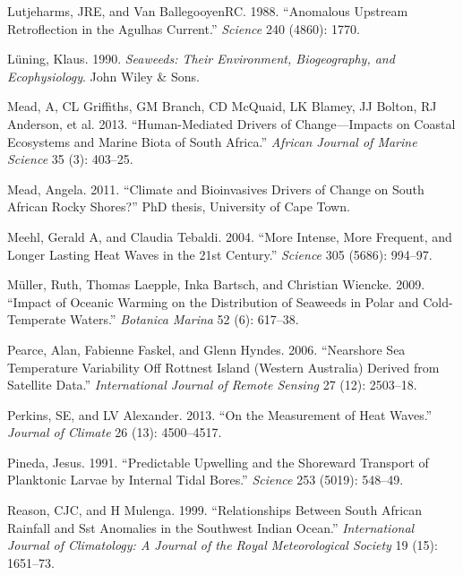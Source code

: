 \documentclass[12pt,a4paper,]{article}
\begin{document}
\leavevmode\hypertarget{ref-Lutjeharms1988}{}%
Lutjeharms, JRE, and Van BallegooyenRC. 1988. ``Anomalous Upstream
Retroflection in the Agulhas Current.'' \emph{Science} 240 (4860): 1770.

\leavevmode\hypertarget{ref-Luning1990}{}%
Lüning, Klaus. 1990. \emph{Seaweeds: Their Environment, Biogeography,
and Ecophysiology}. John Wiley \& Sons.

\leavevmode\hypertarget{ref-Mead2013}{}%
Mead, A, CL Griffiths, GM Branch, CD McQuaid, LK Blamey, JJ Bolton, RJ
Anderson, et al. 2013. ``Human-Mediated Drivers of Change---Impacts on
Coastal Ecosystems and Marine Biota of South Africa.'' \emph{African
Journal of Marine Science} 35 (3): 403--25.

\leavevmode\hypertarget{ref-Mead2011}{}%
Mead, Angela. 2011. ``Climate and Bioinvasives Drivers of Change on
South African Rocky Shores?'' PhD thesis, University of Cape Town.

\leavevmode\hypertarget{ref-Meehl2004}{}%
Meehl, Gerald A, and Claudia Tebaldi. 2004. ``More Intense, More
Frequent, and Longer Lasting Heat Waves in the 21st Century.''
\emph{Science} 305 (5686): 994--97.

\leavevmode\hypertarget{ref-Muller2009}{}%
Müller, Ruth, Thomas Laepple, Inka Bartsch, and Christian Wiencke. 2009.
``Impact of Oceanic Warming on the Distribution of Seaweeds in Polar and
Cold-Temperate Waters.'' \emph{Botanica Marina} 52 (6): 617--38.

\leavevmode\hypertarget{ref-Pearce2006}{}%
Pearce, Alan, Fabienne Faskel, and Glenn Hyndes. 2006. ``Nearshore Sea
Temperature Variability Off Rottnest Island (Western Australia) Derived
from Satellite Data.'' \emph{International Journal of Remote Sensing} 27
(12): 2503--18.

\leavevmode\hypertarget{ref-Perkins2013}{}%
Perkins, SE, and LV Alexander. 2013. ``On the Measurement of Heat
Waves.'' \emph{Journal of Climate} 26 (13): 4500--4517.

\leavevmode\hypertarget{ref-Pineda1991}{}%
Pineda, Jesus. 1991. ``Predictable Upwelling and the Shoreward Transport
of Planktonic Larvae by Internal Tidal Bores.'' \emph{Science} 253
(5019): 548--49.

\leavevmode\hypertarget{ref-Reason1999}{}%
Reason, CJC, and H Mulenga. 1999. ``Relationships Between South African
Rainfall and Sst Anomalies in the Southwest Indian Ocean.''
\emph{International Journal of Climatology: A Journal of the Royal
Meteorological Society} 19 (15): 1651--73.
\end{document}
